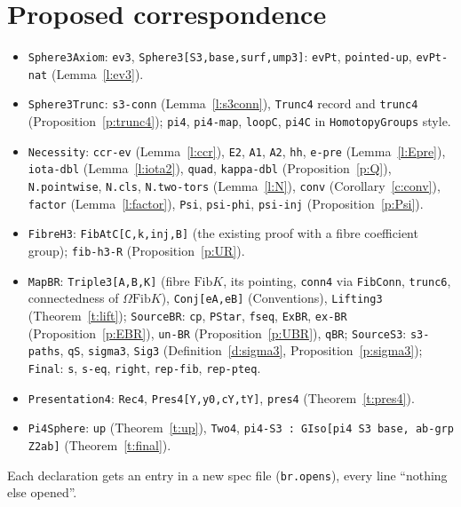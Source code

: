\documentclass[11pt]{amsart}
\theoremstyle{definition}
\theoremstyle{remark}
\newcommand{\Om}{\Omega}
\newcommand{\code}[1]{\texttt{#1}}
\newcommand{\Fib}{\mathrm{Fib}}
\begin{document}
\section{Proposed correspondence}\label{s:corr}
\begin{itemize}
\item \code{Sphere3Axiom}: \code{ev3}, \code{Sphere3[S3,base,surf,ump3]}:
  \code{evPt}, \code{pointed-up}, \code{evPt-nat} (Lemma~\ref{l:ev3}).
\item \code{Sphere3Trunc}: \code{s3-conn} (Lemma~\ref{l:s3conn}), \code{Trunc4}
  record and \code{trunc4} (Proposition~\ref{p:trunc4}); \code{pi4}, \code{pi4-map},
  \code{loopC}, \code{pi4C} in \code{HomotopyGroups} style.
\item \code{Necessity}: \code{ccr-ev} (Lemma~\ref{l:ccr}), \code{E2}, \code{A1}, \code{A2}, \code{hh}, \code{e-pre} (Lemma~\ref{l:Epre}), \code{iota-dbl}
  (Lemma~\ref{l:iota2}), \code{quad}, \code{kappa-dbl} (Proposition~\ref{p:Q}),
  \code{N.pointwise}, \code{N.cls}, \code{N.two-tors} (Lemma~\ref{l:N}), \code{conv} (Corollary~\ref{c:conv}),
  \code{factor} (Lemma~\ref{l:factor}), \code{Psi}, \code{psi-phi}, \code{psi-inj}
  (Proposition~\ref{p:Psi}).
\item \code{FibreH3}: \code{FibAtC[C,k,inj,B]} (the existing proof with a fibre
  coefficient group); \code{fib-h3-R} (Proposition~\ref{p:UR}).
\item \code{MapBR}: \code{Triple3[A,B,K]} (fibre $\Fib K$, its pointing, \code{conn4} via
  \code{FibConn}, \code{trunc6}, connectedness of $\Om\Fib K$), \code{Conj[eA,eB]}
  (Conventions), \code{Lifting3} (Theorem~\ref{t:lift}); \code{SourceBR}:
  \code{cp}, \code{PStar}, \code{fseq}, \code{ExBR}, \code{ex-BR}
  (Proposition~\ref{p:EBR}), \code{un-BR} (Proposition~\ref{p:UBR}), \code{qBR};
  \code{SourceS3}: \code{s3-paths}, \code{qS}, \code{sigma3}, \code{Sig3}
  (Definition~\ref{d:sigma3}, Proposition~\ref{p:sigma3}); \code{Final}: \code{s},
  \code{s-eq}, \code{right}, \code{rep-fib}, \code{rep-pteq}.
\item \code{Presentation4}: \code{Rec4}, \code{Pres4[Y,y0,cY,tY]}, \code{pres4}
  (Theorem~\ref{t:pres4}).
\item \code{Pi4Sphere}: \code{up} (Theorem~\ref{t:up}), \code{Two4},
  \code{pi4-S3 : GIso[pi4 S3 base, ab-grp Z2ab]} (Theorem~\ref{t:final}).
\end{itemize}
Each declaration gets an entry in a new spec file (\code{br.opens}), every line
``nothing else opened''.
\end{document}
